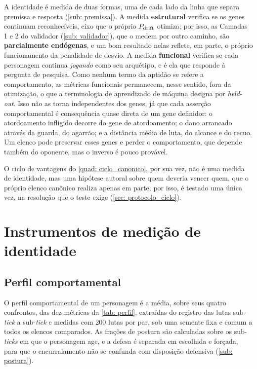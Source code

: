 A identidade é medida de duas formas, uma de cada lado da linha que separa premissa e resposta (\autoref{sub: premissa}). A medida \textbf{estrutural} verifica se os genes continuam reconhecíveis, eixo que o próprio $P_{\mathrm{drift}}$ otimiza; por isso, as Camadas 1 e 2 do validador (\autoref{sub: validador}), que o medem por outro caminho, são \textbf{parcialmente endógenas}, e um bom resultado nelas reflete, em parte, o próprio funcionamento da penalidade de desvio. A medida \textbf{funcional} verifica se cada personagem continua \textit{jogando} como seu arquétipo, e é ela que responde à pergunta de pesquisa. Como nenhum termo da aptidão se refere a comportamento, as métricas funcionais permanecem, nesse sentido, fora da otimização, o que a terminologia de aprendizado de máquina designa por \textit{held-out}. Isso não as torna independentes dos genes, já que cada asserção comportamental é consequência quase direta de um gene definidor: o atordoamento infligido decorre do gene de atordoamento; o dano arrancado através da guarda, do agarrão; e a distância média de luta, do alcance e do recuo. Um elenco pode preservar esses genes e perder o comportamento, que depende também do oponente, mas o inverso é pouco provável.

O ciclo de vantagens do \autoref{quad: ciclo_canonico}, por sua vez, não é uma medida de identidade, mas uma hipótese autoral sobre quem deveria vencer quem, que o próprio elenco canônico realiza apenas em parte; por isso, é testado uma única vez, na resolução que o teste exige (\autoref{sec: protocolo_ciclo}).

\section{Instrumentos de medição de identidade}
\label{sec: instrumentos}

\subsection{Perfil comportamental}
\label{sub: perfil}

O perfil comportamental de um personagem é a média, sobre seus quatro confrontos, das dez métricas da \autoref{tab: perfil}, extraídas do registro das lutas sub-\textit{tick} a sub-\textit{tick} e medidas com 200 lutas por par, sob uma semente fixa e comum a todos os elencos comparados. As frações de postura são calculadas sobre os sub-\textit{ticks} em que o personagem age, e a defesa é separada em escolhida e forçada, para que o encurralamento não se confunda com disposição defensiva (\autoref{sub: postura}).

